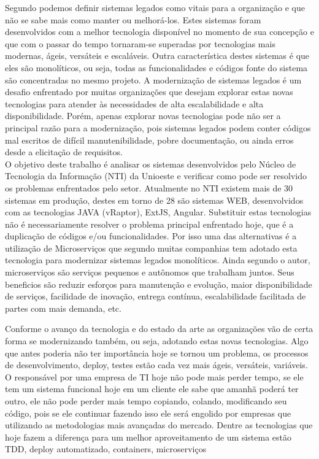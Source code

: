 \documentclass[12pt]{article}
\begin{document}
Segundo \cite{Bennett} podemos definir sistemas legados como vitais para a organização e que não se sabe mais como manter ou melhorá-los. Estes sistemas foram desenvolvidos com a melhor tecnologia disponível no momento de sua concepção e que com o passar do tempo tornaram-se superadas por tecnologias mais modernas, ágeis, versáteis e escaláveis. Outra característica destes sistemas é que eles são monolíticos, ou seja, todas as funcionalidades e códigos fonte do sistema são concentradas no mesmo projeto. A modernização de sistemas legados é um desafio enfrentado por muitas organizações que desejam explorar estas novas tecnologias para atender às necessidades de alta escalabilidade e alta disponibilidade\cite{Furda2018}. Porém, apenas explorar novas tecnologias pode não ser a principal razão para a modernização, pois sistemas legados podem conter códigos mal escritos de difícil manutenibilidade, pobre documentação, ou ainda erros desde a elicitação de requisitos.  \\
O objetivo deste trabalho é analisar os sistemas desenvolvidos pelo Núcleo de Tecnologia da Informação (NTI) da Unioeste e verificar como pode ser resolvido os problemas enfrentados pelo setor. Atualmente no NTI existem mais de 30 sistemas em produção, destes em torno de 28 são sistemas WEB, desenvolvidos com as tecnologias JAVA (vRaptor), ExtJS, Angular. Substituir estas tecnologias não é necessariamente resolver o problema principal enfrentado hoje, que é a duplicação de códigos e/ou funcionalidades. Por isso uma das alternativas é a utilização de Microserviços que segundo \cite{Carvalho2019} muitas companhias tem adotado esta tecnologia  para modernizar sistemas legados monolíticos. Ainda segundo o autor, microserviços são serviços pequenos e autônomos que trabalham juntos. Seus beneficios são reduzir esforços para manutenção e evolução, maior disponibilidade de serviços, facilidade de inovação, entrega contínua, escalabilidade facilitada de partes com mais demanda, etc.

Conforme o avanço da tecnologia e do estado da arte as organizações vão de certa forma se modernizando também, ou seja, adotando estas novas tecnologias. Algo que antes poderia não ter importância hoje se tornou um problema, os processos de desenvolvimento, deploy, testes estão cada vez mais ágeis, versáteis, variáveis. O responsável por uma empresa de TI hoje não pode mais perder tempo, se ele tem um sistema funcional hoje em um cliente ele sabe que amanhã poderá ter outro, ele não pode perder mais tempo copiando, colando, modificando seu código, pois se ele continuar fazendo isso ele será engolido por empresas que utilizando as metodologias mais avançadas do mercado. Dentre as tecnologias que hoje fazem a diferença para um melhor aproveitamento de um sistema estão TDD, deploy automatizado, containers, microserviços
\end{document}
